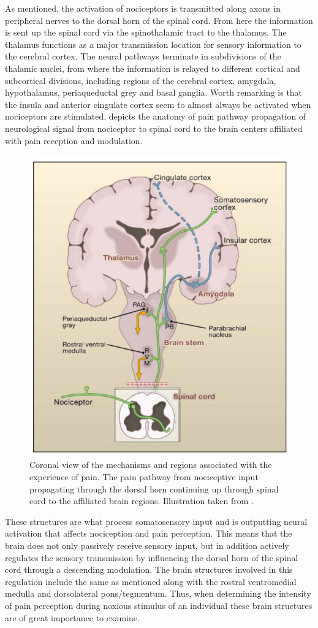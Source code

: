 As mentioned, the activation of nociceptors is transmitted along axons in peripheral nerves to the dorsal horn of the spinal cord. From here the information is sent up the spinal cord via the spinothalamic tract to the thalamus. The thalamus functions as a major transmission location for sensory information to the cerebral cortex. The neural pathways terminate in subdivisions of the thalamic nuclei, from where the information is relayed to different cortical and subcortical divisions, including regions of the cerebral cortex, amygdala, hypothalamus, periaqueductal grey and basal ganglia. Worth remarking is that the insula and anterior cingulate cortex seem to almost always be activated when nociceptors are stimulated. \cite{Tracey2007, Davis2017}  depicts the anatomy of pain pathway propagation of neurological signal from nociceptor to spinal cord to the brain centers affiliated with pain reception and modulation.

\begin{figure}[H]                 
	\includegraphics[width=.47\textwidth]{figures/aBackground/Brain}  
	\caption{Coronal view of the mechanisms and regions associated with the experience of pain. The pain pathway from nociceptive input propagating through the dorsal horn continuing up through spinal cord to the affiliated brain regions. Illustration taken from \cite{Basbaum2009}.}
	\label{fig:back:brain} 
\end{figure}

These structures are what process somatosensory input and is outputting neural activation that affects nociception and pain perception. \cite{Garland2013} This means that the brain does not only passively receive sensory input, but in addition actively regulates the sensory transmission by influencing the dorsal horn of the spinal cord through a descending modulation. The brain structures involved in this regulation include the same as mentioned along with the rostral ventromedial medulla and dorsolateral pons/tegmentum. \cite{Tracey2007} Thus, when determining the intensity of pain perception during noxious stimulus of an individual these brain structures are of great importance to examine. 
